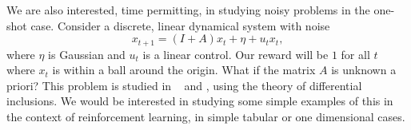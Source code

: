 \documentclass{article}
\begin{document}
We are also interested, time permitting, in studying noisy problems in the one-shot case. Consider a discrete, linear dynamical system with noise
\[
    x_{t+1} = (I + A) x_t + \eta + u_t x_t,
\]
where $\eta$ is Gaussian and $u_t$ is a linear control. Our reward will be $1$ for all $t$ where $x_t$ is within a ball around the origin. What if the matrix $A$ is unknown a priori? This problem is studied in ~\cite{ornikIsraelTopcu} and \cite{ahmadiIsraelTopcu}, using the theory of differential inclusions. We would be interested in studying some simple examples of this in the context of reinforcement learning, in simple tabular or one dimensional cases. 

{}


 

\end{document}
